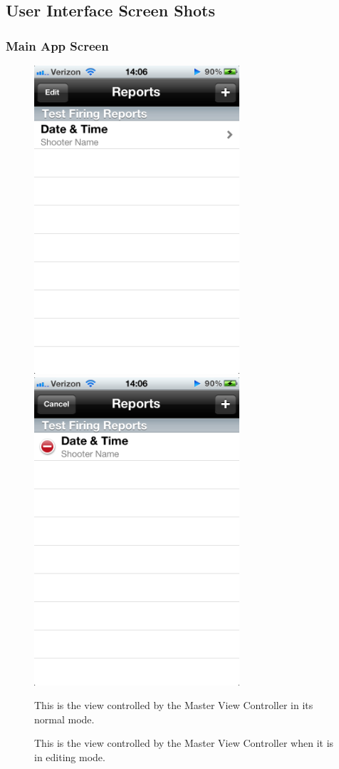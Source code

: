 \newpage
\subsection{User Interface Screen Shots}
\subsubsection{Main App Screen}
\begin{figure}[H!htb]
\includegraphics[width=3in]{ScreenShots111011/MainPage.png}
\includegraphics[width=3in]{ScreenShots111011/MainPageEdit.png}
\caption{This is the view controlled by the Master View Controller in its normal mode.}
\caption{This is the view controlled by the Master View Controller when it is in editing mode.}
\end{figure}

